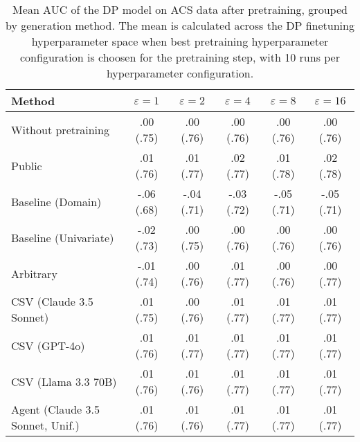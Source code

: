 \begin{table}[h!]
    \centering
    \caption{Mean AUC of the DP model on ACS data after pretraining, grouped by generation method. The mean is calculated across the DP finetuning hyperparameter space when best pretraining hyperparameter configuration is choosen for the pretraining step, with 10 runs per hyperparameter configuration.}
    \label{tab:epsilon_comparison}
    \begin{tabular}{lccccc}
    \toprule
    Method & $\varepsilon=1$ & $\varepsilon=2$ & $\varepsilon=4$ & $\varepsilon=8$ & $\varepsilon=16$ \\
    \midrule
    Without pretraining & .00 {\small (.75)} & .00 {\small (.76)} & .00 {\small (.76)} & .00 {\small (.76)} & .00 {\small (.76)} \\
    \arrayrulecolor{black!50!}\midrule
    Public & \cellcolor{silver!30}.01 {\small (.76)} & \cellcolor{gold!30}.01 {\small (.77)} & \cellcolor{gold!30}.02 {\small (.77)} & \cellcolor{gold!30}.01 {\small (.78)} & \cellcolor{gold!30}.02 {\small (.78)} \\
    \arrayrulecolor{black!50!}\midrule
    Baseline (Domain) & -.06 {\small (.68)} & -.04 {\small (.71)} & -.03 {\small (.72)} & -.05 {\small (.71)} & -.05 {\small (.71)} \\
    Baseline (Univariate) & -.02 {\small (.73)} & .00 {\small (.75)} & .00 {\small (.76)} & .00 {\small (.76)} & .00 {\small (.76)} \\
    \arrayrulecolor{black!50!}\midrule
    Arbitrary & -.01 {\small (.74)} & .00 {\small (.76)} & .01 {\small (.77)} & .00 {\small (.76)} & .00 {\small (.77)} \\
    \arrayrulecolor{black!50!}\midrule
    CSV (Claude 3.5 Sonnet) & .01 {\small (.75)} & .00 {\small (.76)} & .01 {\small (.77)} & .01 {\small (.77)} & .01 {\small (.77)} \\
    CSV (GPT-4o) & \cellcolor{silver!30}.01 {\small (.76)} & \cellcolor{bronze!30}.01 {\small (.77)} & \cellcolor{silver!30}.01 {\small (.77)} & \cellcolor{bronze!30}.01 {\small (.77)} & \cellcolor{bronze!30}.01 {\small (.77)} \\
    CSV (Llama 3.3 70B) & \cellcolor{bronze!30}.01 {\small (.76)} & .01 {\small (.76)} & .01 {\small (.77)} & \cellcolor{silver!30}.01 {\small (.77)} & \cellcolor{bronze!30}.01 {\small (.77)} \\
    \arrayrulecolor{black!50!}\midrule
    Agent (Claude 3.5 Sonnet, Unif.) & .01 {\small (.76)} & .01 {\small (.76)} & .01 {\small (.77)} & .01 {\small (.77)} & \cellcolor{silver!30}.01 {\small (.77)} \\

\end{tabular}
\end{table}

